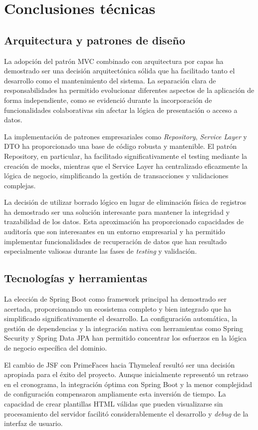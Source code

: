 \section{Conclusiones técnicas}\label{conclusiones-tecncicas}
\subsection{Arquitectura y patrones de diseño}\label{arquitectura-patrones-diseño}
La adopción del patrón MVC combinado con arquitectura por capas ha demostrado ser una decisión arquitectónica sólida que ha facilitado tanto el desarrollo como el mantenimiento del sistema. La separación clara de responsabilidades ha permitido evolucionar diferentes aspectos de la aplicación de forma independiente, como se evidenció durante la incorporación de funcionalidades colaborativas sin afectar la lógica de presentación o acceso a datos.

La implementación de patrones empresariales como \emph{Repository}, \emph{Service Layer} y DTO ha proporcionado una base de código robusta y mantenible. El patrón Repository, en particular, ha facilitado significativamente el testing mediante la creación de mocks, mientras que el Service Layer ha centralizado eficazmente la lógica de negocio, simplificando la gestión de transacciones y validaciones complejas.

La decisión de utilizar borrado lógico en lugar de eliminación física de registros ha demostrado ser una solución interesante para mantener la integridad y trazabilidad de los datos. Esta aproximación ha proporcionado capacidades de auditoría que son interesantes en un entorno empresarial y ha permitido implementar funcionalidades de recuperación de datos que han resultado especialmente valiosas durante las fases de \emph{testing} y validación.

\subsection{Tecnologías y herramientas}\label{tencologias-herramientas}
La elección de Spring Boot como framework principal ha demostrado ser acertada, proporcionando un ecosistema completo y bien integrado que ha simplificado significativamente el desarrollo. La configuración automática, la gestión de dependencias y la integración nativa con herramientas como Spring Security y Spring Data JPA han permitido concentrar los esfuerzos en la lógica de negocio específica del dominio.

El cambio de JSF con PrimeFaces hacia Thymeleaf resultó ser una decisión apropiada para el éxito del proyecto. Aunque inicialmente representó un retraso en el cronograma, la integración óptima con Spring Boot y la menor complejidad de configuración compensaron ampliamente esta inversión de tiempo. La capacidad de crear plantillas HTML válidas que pueden visualizarse sin procesamiento del servidor facilitó considerablemente el desarrollo y \emph{debug} de la interfaz de usuario.

